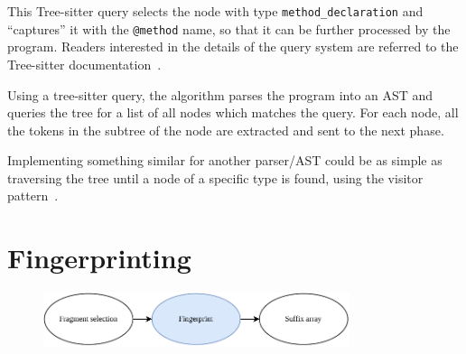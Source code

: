 This Tree-sitter query selects the node with type \verb|method_declaration| and
``captures'' it with the \verb|@method| name, so that it can be further processed by the
program. Readers interested in the details of the query system are referred to the
Tree-sitter documentation~\cite{treesitter}.

Using a tree-sitter query, the algorithm parses the program into an AST and queries the
tree for a list of all nodes which matches the query. For each node, all the tokens in the
subtree of the node are extracted and sent to the next phase.

Implementing something similar for another parser/AST could be as simple as traversing the
tree until a node of a specific type is found, using the visitor
pattern~\cite[366]{GangOfFour}.


\section{Fingerprinting}

\begin{figure}[H]
    \begin{center}
        \includegraphics[width=0.8\textwidth]{figures/phases/phases_fingerprint.drawio.pdf}
    \end{center}
\end{figure}

